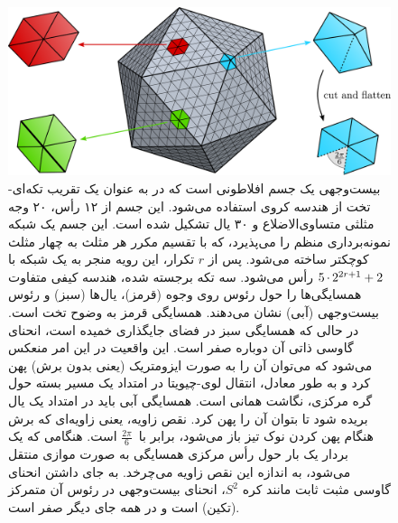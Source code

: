 \begin{figure}
    \centering
    \includegraphics[width=.8\textwidth]{figures/icosahedron_neighborhoods.pdf}
    \vspace*{1ex}
    \caption{\small
        بیست‌وجهی یک جسم افلاطونی است که در \cite{liu2018icoAltAz,gaugeIco2019,zhang2019orientation} به عنوان یک تقریب تکه‌ای-تخت از هندسه کروی استفاده می‌شود.
        این جسم از ۱۲ رأس، ۲۰ وجه مثلثی متساوی‌الاضلاع و ۳۰ یال تشکیل شده است.
        این جسم یک شبکه نمونه‌برداری منظم را می‌پذیرد، که با تقسیم مکرر هر مثلث به چهار مثلث کوچکتر ساخته می‌شود.
        پس از $r$ تکرار، این رویه منجر به یک شبکه با ${5\mkern-1mu\cdot\mkern-1mu 2^{2r+1} + 2}$ رأس می‌شود.
        سه تکه برجسته شده، هندسه کیفی متفاوت همسایگی‌ها را حول رئوس روی وجوه (قرمز)، یال‌ها (سبز) و رئوس بیست‌وجهی (آبی) نشان می‌دهند.
        همسایگی قرمز به وضوح تخت است.
        در حالی که همسایگی سبز در فضای جایگذاری خمیده است، انحنای گاوسی ذاتی آن دوباره صفر است.
        این واقعیت در این امر منعکس می‌شود که می‌توان آن را به صورت ایزومتریک (یعنی بدون برش) پهن کرد و به طور معادل، انتقال لوی-چیویتا در امتداد یک مسیر بسته حول گره مرکزی، نگاشت همانی است.
        همسایگی آبی باید در امتداد یک یال بریده شود تا بتوان آن را پهن کرد.
        نقص زاویه، یعنی زاویه‌ای که برش هنگام پهن کردن نوک تیز باز می‌شود، برابر با~$\frac{2\pi}{6}$ است.
        هنگامی که یک بردار یک بار حول رأس مرکزی همسایگی به صورت موازی منتقل می‌شود، به اندازه این نقص زاویه می‌چرخد.
        به جای داشتن انحنای گاوسی مثبت ثابت مانند کره $S^2$، انحنای بیست‌وجهی در رئوس آن متمرکز (تکین) است و در همه جای دیگر صفر است.
    }
    \label{fig:ico_neighborhoods}
\end{figure}


